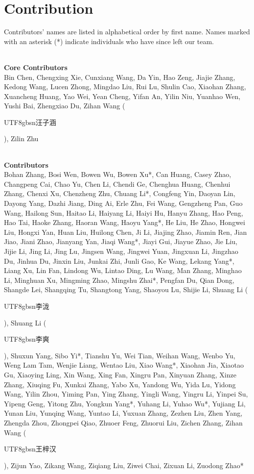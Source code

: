 \documentclass{article}
\theoremstyle{definition}
\begin{document}
\section{Contribution}
\label{sec:contribution}
\newcommand{\cpara}[1]{~\\\textbf{#1}~\\}
Contributors' names are listed in alphabetical order by first name. Names marked with an asterisk (*) indicate individuals who have since left our team. 

\cpara{Core Contributors}
Bin Chen, Chengxing Xie, Cunxiang Wang, Da Yin, Hao Zeng, Jiajie Zhang, Kedong Wang, Lucen Zhong, Mingdao Liu, Rui Lu, Shulin Cao, Xiaohan Zhang, Xuancheng Huang, Yao Wei, Yean Cheng, Yifan An, Yilin Niu, Yuanhao Wen, Yushi Bai, Zhengxiao Du, Zihan Wang (\begin{CJK*}{UTF8}{gbsn}汪子涵\end{CJK*}), Zilin Zhu

\cpara{Contributors}
Bohan Zhang, Bosi Wen, Bowen Wu, Bowen Xu*, Can Huang, Casey Zhao, Changpeng Cai, Chao Yu, Chen Li, Chendi Ge, Chenghua Huang, Chenhui Zhang, Chenxi Xu, Chenzheng Zhu, Chuang Li*, Congfeng Yin, Daoyan Lin, Dayong Yang, Dazhi Jiang, Ding Ai, Erle Zhu, Fei Wang, Gengzheng Pan, Guo Wang, Hailong Sun, Haitao Li, Haiyang Li, Haiyi Hu, Hanyu Zhang, Hao Peng, Hao Tai, Haoke Zhang, Haoran Wang, Haoyu Yang*, He Liu, He Zhao, Hongwei Liu, Hongxi Yan, Huan Liu, Huilong Chen, Ji Li, Jiajing Zhao, Jiamin Ren, Jian Jiao, Jiani Zhao, Jianyang Yan, Jiaqi Wang*, Jiayi Gui, Jiayue Zhao, Jie Liu, Jijie Li, Jing Li, Jing Lu, Jingsen Wang, Jingwei Yuan, Jingxuan Li, Jingzhao Du, Jinhua Du, Jinxin Liu, Junkai Zhi, Junli Gao, Ke Wang, Lekang Yang*, Liang Xu, Lin Fan, Lindong Wu, Lintao Ding, Lu Wang, Man Zhang, Minghao Li, Minghuan Xu, Mingming Zhao, Mingshu Zhai*, Pengfan Du, Qian Dong, Shangde Lei, Shangqing Tu, Shangtong Yang, Shaoyou Lu, Shijie Li, Shuang Li (\begin{CJK*}{UTF8}{gbsn}李泷\end{CJK*}), Shuang Li (\begin{CJK*}{UTF8}{gbsn}李爽\end{CJK*}), Shuxun Yang, Sibo Yi*, Tianshu Yu, Wei Tian, Weihan Wang, Wenbo Yu, Weng Lam Tam, Wenjie Liang, Wentao Liu, Xiao Wang*, Xiaohan Jia, Xiaotao Gu, Xiaoying Ling, Xin Wang, Xing Fan, Xingru Pan, Xinyuan Zhang, Xinze Zhang, Xiuqing Fu, Xunkai Zhang, Yabo Xu, Yandong Wu, Yida Lu, Yidong Wang, Yilin Zhou, Yiming Pan, Ying Zhang, Yingli Wang, Yingru Li, Yinpei Su, Yipeng Geng, Yitong Zhu, Yongkun Yang*, Yuhang Li, Yuhao Wu*, Yujiang Li, Yunan Liu, Yunqing Wang, Yuntao Li, Yuxuan Zhang, Zezhen Liu, Zhen Yang, Zhengda Zhou, Zhongpei Qiao, Zhuoer Feng, Zhuorui Liu, Zichen Zhang, Zihan Wang (\begin{CJK*}{UTF8}{gbsn}王梓汉\end{CJK*}), Zijun Yao, Zikang Wang, Ziqiang Liu, Ziwei Chai, Zixuan Li, Zuodong Zhao*
\end{document}
